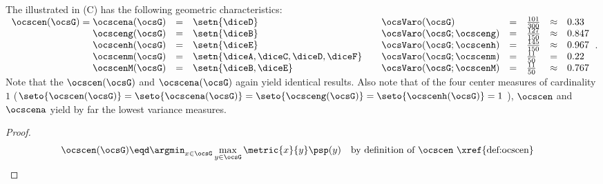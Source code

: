 \begin{tabstr}{0.75}
\begin{example} %
\label{ex:wdie}
The   illustrated in  (C) 
has the following geometric characteristics:
\\ %
\indentx$\begin{array}{rcl @{\qquad} lclcl}
    \ocscen(\ocsG)=\ocscena(\ocsG) &=&\setn{\diceD}                      & \ocsVaro(\ocsG)          &=&\frac{101}{300} &\approx& 0.33\\
    \ocsceng(\ocsG)                &=&\setn{\diceB}                      & \ocsVaro(\ocsG;\ocsceng) &=&\frac{127}{150} &\approx& 0.847 \\ 
    \ocscenh(\ocsG)                &=&\setn{\diceE}                      & \ocsVaro(\ocsG;\ocscenh) &=&\frac{145}{150} &\approx& 0.967 \\
    \ocscenm(\ocsG)                &=&\setn{\diceA,\diceC,\diceD,\diceF} & \ocsVaro(\ocsG;\ocscenm) &=&\frac{ 11}{ 50} &=&       0.22 \\
    \ocscenM(\ocsG)                &=&\setn{\diceB,\diceE}               & \ocsVaro(\ocsG;\ocscenM) &=&\frac{ 11}{ 50} &\approx& 0.767
  \end{array}$.
\\
Note that the  $\ocscen(\ocsG)$ and  $\ocscena(\ocsG)$ 
again yield identical results.
Also note that of the four center measures of cardinality $1$
($\seto{\ocscen(\ocsG)}=\seto{\ocscena(\ocsG)}=\seto{\ocsceng(\ocsG)}=\seto{\ocscenh(\ocsG)}=1$ ),
$\ocscen$ and $\ocscena$ yield by far the lowest variance measures.
\end{example}
\begin{proof}
\begin{align*}
  \ocscen(\ocsG)
    &\eqd \argmin_{x\in\ocsG}\max_{y\in\ocsG}\metric{x}{y}\psp(y)
    &&\text{by definition of $\ocscen$ \xref{def:ocscen}}

\end{align*}
\end{proof}
\end{tabstr}
